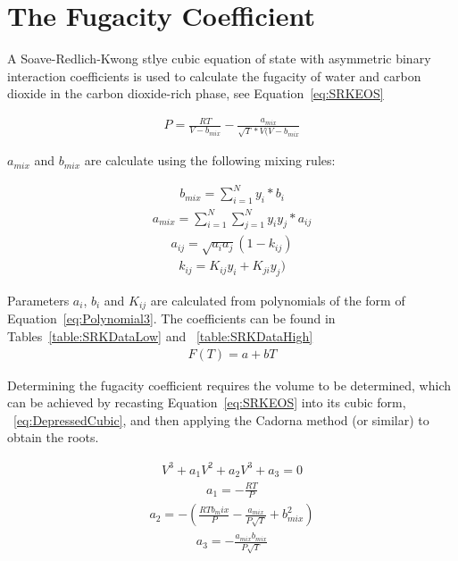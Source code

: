 \section{The Fugacity Coefficient}
\label{sec:fug_constant}
A Soave-Redlich-Kwong stlye cubic equation of state with asymmetric binary interaction coefficients is used to calculate the fugacity of water and carbon dioxide in the carbon dioxide-rich phase, see Equation~\eqref{eq:SRKEOS}

\begin{align} 
    P = \frac{RT}{V-b_{mix}} - \frac{a_{mix}}{\sqrt{T}*V(V-b_{mix}}  \label{eq:SRKEOS}
\end{align}

\(a_{mix}\) and \(b_{mix}\) are calculate using the following mixing rules:

\begin{align} 
    b_{mix} = \sum_{i=1}^N y_i * b_i \label{eq:bmix}
\end{align}
\begin{align} 
    a_{mix} = \sum_{i=1}^N \sum_{j=1}^N y_i y_j * a_{ij} \label{eq:amix}
\end{align}
\begin{align} 
    a_{ij} = \sqrt{a_i a_j} (1 - k_{ij}) \label{eq:aij}
\end{align}
\begin{align} 
    k_{ij} = K_{ij}y_i + K_{ji}y_j) \label{eq:kij}
\end{align}

Parameters \(a_i\), \(b_i\) and \(K_{ij}\) are calculated from polynomials of the form of Equation~\eqref{eq:Polynomial3}. The coefficients can be found in Tables~\ref{table:SRKDataLow} and ~\ref{table:SRKDataHigh}
\begin{align} 
    F(T) = a + bT \label{eq:Polynomial3}
\end{align}



Determining the fugacity coefficient requires the volume to be determined, which can be achieved by recasting Equation~\eqref{eq:SRKEOS} into its cubic form, ~\eqref{eq:DepressedCubic}, and then applying the Cadorna method (or similar) to obtain the roots.

\begin{align} 
    V^3 + a_1 V^2 + a_2 V^3 + a_3= 0 \label{eq:DepressedCubic}
\end{align}
\begin{align} 
    a_1 = - \frac{RT}{P}
\end{align}
\begin{align} 
    a_2 = - \left( \frac{RTb_mix}{P} - \frac{a_{mix}}{P\sqrt{T}}+b_{mix}^2 \right)
\end{align}
\begin{align} 
    a_3 = - \frac{a_{mix}b_{mix}}{P\sqrt{T}}
\end{align}

